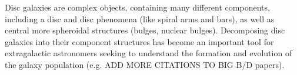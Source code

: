 \documentclass[../main.tex]{subfiles}
\begin{document}
\label{sec:introduction}

Disc galaxies are complex objects, containing many different components, including a disc and disc phenomena (like spiral arms and bars), as well as central more spheroidal structures (bulges, nuclear bulges). Decomposing disc galaxies into their component structures has become an important tool for extragalactic astronomers seeking to understand the formation and evolution of the galaxy population (e.g. \citealt{Simmard,Lackner,2017MNRAS.469.3363K} ADD MORE CITATIONS TO BIG B/D papers). 

 




\end{document}
